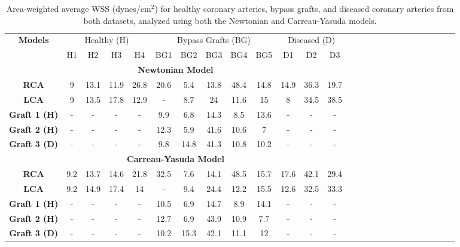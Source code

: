 ﻿\documentclass[12pt,a4paper]{article}
\theoremstyle{definition}
\numberwithin{equation}{section}
\begin{document}
\begin{table}[h!]
\centering
    \setlength{\tabcolsep}{5pt}
    \renewcommand{\arraystretch}{0.9}
    \caption{Area-weighted average WSS (dynes/cm$^2$) for healthy coronary arteries, bypass grafts, and diseased coronary arteries from both datasets, analyzed using both the Newtonian and Carreau-Yasuda models.}
    \begin{tabular}{|c|c|c|c|c|c|c|c|c|c|c|c|c|c|c|c|c|c|c|c|c|c|c|c|c|c|} 
    \hline 
    \multirow{2}{*}{\textbf{Models}} & \multicolumn{4}{c|}{Healthy (H)} & \multicolumn{5}{c|}{Bypass Grafts (BG)} &\multicolumn{3}{c|}{Diseased (D)} \\ \cline{2-13} & H1 & H2 & H3 & H4 & BG1 & BG2 & BG3 & BG4 & BG5 & D1 & D2 & D3 \\ \hline
 \multicolumn{13}{|c|}{\textbf{Newtonian Model}}\\ \hline  \textbf{RCA}& 9 & 13.1 & 11.9 & 26.8& 20.6 & 5.4 & 13.8 & 48.4 & 14.8 &14.9 & 36.3 &19.7  \\ \hline  \textbf{LCA}& 9 & 13.5 & 17.8 & 12.9& - &8.7 & 24 & 11.6 & 15 & 8 &34.5& 38.5  \\ \hline 
   \textbf{Graft 1 (H)}& - & - & - & -& 9.9 & 6.8 & 14.3 & 8.5 & 13.6 & - &-& -  \\ \hline 
   \textbf{Graft 2 (H)}& - & - & - & -& 12.3 & 5.9 & 41.6 & 10.6 & 7 & - &-& - \\ \hline 
   \textbf{Graft 3 (D)}& - & - & - & -& 9.8 & 14.8 & 41.3 & 10.8 & 10.2 & - &-& - \\ \hline
  \multicolumn{13}{|c|}{\textbf{Carreau-Yasuda Model}}\\ \hline  \textbf{RCA}& 9.2 & 13.7 & 14.6 & 21.8& 32.5 & 7.6 & 14.1 & 48.5 & 15.7 &17.6 & 42.1 &29.4  \\ \hline  \textbf{LCA}& 9.2 & 14.9 & 17.4 & 14& - &9.4 & 24.4 & 12.2 & 15.5 & 12.6 &32.5& 33.3  \\ \hline 
   \textbf{Graft 1 (H)}& - & - & - & -& 10.5 & 6.9 & 14.7 & 8.9 & 14.1 & - &-& -  \\ \hline 
   \textbf{Graft 2 (H)}& - & - & - & -& 12.7 & 6.9 & 43.9 & 10.9 & 7.7 & - &-& - \\ \hline 
   \textbf{Graft 3 (D)}& - & - & - & -& 10.2 & 15.3 & 42.1 & 11.1 & 12 & - &-& - \\ \hline
   \end{tabular}
    \label{tab:b}
\end{table}
\end{document}
